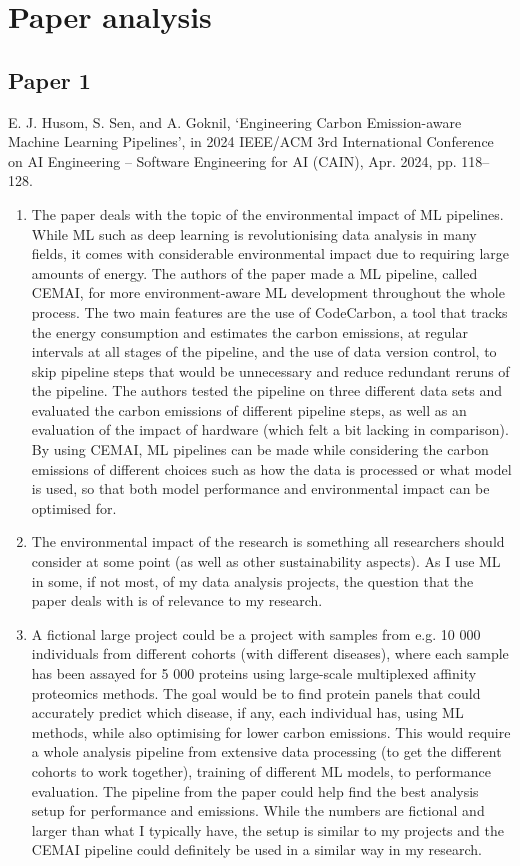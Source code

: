 \documentclass[11pt]{article}
\begin{document}
\section{Paper analysis}

\subsection{Paper 1}

E. J. Husom, S. Sen, and A. Goknil, ‘Engineering Carbon Emission-aware Machine Learning Pipelines’, in 2024 IEEE/ACM 3rd International Conference on AI Engineering – Software Engineering for AI (CAIN), Apr. 2024, pp. 118–128.

\begin{enumerate}
    \item The paper deals with the topic of the environmental impact of ML pipelines. While ML such as deep learning is revolutionising data analysis in many fields, it comes with considerable environmental impact due to requiring large amounts of energy. The authors of the paper made a ML pipeline, called CEMAI, for more environment-aware ML development throughout the whole process. The two main features are the use of CodeCarbon, a tool that tracks the energy consumption and estimates the carbon emissions, at regular intervals at all stages of the pipeline, and the use of data version control, to skip pipeline steps that would be unnecessary and reduce redundant reruns of the pipeline. The authors tested the pipeline on three different data sets and evaluated the carbon emissions of different pipeline steps, as well as an evaluation of the impact of hardware (which felt a bit lacking in comparison). By using CEMAI, ML pipelines can be made while considering the carbon emissions of different choices such as how the data is processed or what model is used, so that both model performance and environmental impact can be optimised for.

    \item The environmental impact of the research is something all researchers should consider at some point (as well as other sustainability aspects). As I use ML in some, if not most, of my data analysis projects, the question that the paper deals with is of relevance to my research.

    \item A fictional large project could be a project with samples from e.g. 10 000 individuals from different cohorts (with different diseases), where each sample has been assayed for 5 000 proteins using large-scale multiplexed affinity proteomics methods. The goal would be to find protein panels that could accurately predict which disease, if any, each individual has, using ML methods, while also optimising for lower carbon emissions. This would require a whole analysis pipeline from extensive data processing (to get the different cohorts to work together), training of different ML models, to performance evaluation. The pipeline from the paper could help find the best analysis setup for performance and emissions. While the numbers are fictional and larger than what I typically have, the setup is similar to my projects and the CEMAI pipeline could definitely be used in a similar way in my research.


\end{enumerate}
\end{document}
